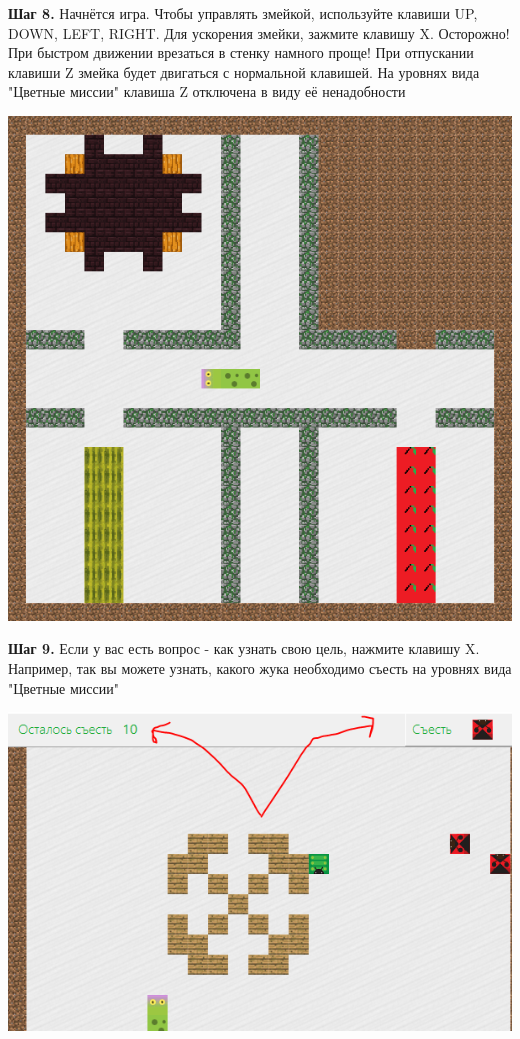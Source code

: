 \documentclass[a4paper,14pt]{extarticle}
\begin{document}
\textbf{Шаг 8.} Начнётся игра. Чтобы управлять змейкой, используйте клавиши UP, DOWN, LEFT, RIGHT. Для ускорения змейки, зажмите клавишу X. Осторожно! При быстром движении врезаться в стенку намного проще! При отпускании клавиши Z змейка будет двигаться с нормальной клавишей. На уровнях вида "Цветные миссии" клавиша Z отключена в виду её ненадобности 
\begin{center}
\includegraphics[scale=.9]{img8}
\end{center}

\textbf{Шаг 9.} Если у вас есть вопрос - как узнать свою цель, нажмите клавишу X. Например, так вы можете узнать, какого жука необходимо съесть на уровнях вида "Цветные миссии"
\begin{center}
\includegraphics[scale=.9]{img9}
\end{center}
\end{document}

